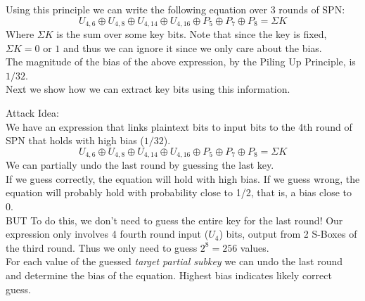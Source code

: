 \documentclass[9pt]{beamer}
\begin{document}
\begin{frame}
Using this principle we can write the following equation over 3 rounds of SPN:
\[ U_{4,6} \oplus U_{4,8} \oplus U_{4,14} \oplus U_{4, 16} \oplus P_5 \oplus P_7 \oplus P_8 = \Sigma K \]
\pause Where $\Sigma K$ is the sum over some key bits. Note that since the key is fixed, $\Sigma K = 0$ or $1$ and thus we can ignore it since we only care about the bias.\\
\vspace{5mm}
\pause The magnitude of the bias of the above expression, by the Piling Up Principle, is $1/32$. \\
\vspace{5mm}
\pause Next we show how we can extract key bits using this information.
\end{frame}

\begin{frame}
Attack Idea:\\
\vspace{3mm}
We have an expression that links plaintext bits to input bits to the 4th round of SPN that holds with high bias ($1/32$). 
\[ U_{4,6} \oplus U_{4,8} \oplus U_{4,14} \oplus U_{4, 16} \oplus P_5 \oplus P_7 \oplus P_8 = \Sigma K \]
\pause We can partially undo the last round by guessing the last key. \\
\vspace{3mm}
\pause
If we guess correctly, the equation will hold with high bias. If we guess wrong, the equation will probably hold with probability close to 1/2, that is, a bias close to 0.\\
\vspace{3mm}
\pause
BUT To do this, we don't need to guess the entire key for the last round! \pause Our expression only involves 4 fourth round input ($U_4$) bits, output from 2 S-Boxes of the third round. Thus we only need to guess $2^8 = 256$ values.\\
\vspace{3mm}
\pause
For each value of the guessed \textit{target partial subkey} we can undo the last round and determine the bias of the equation. Highest bias indicates likely correct guess.
\end{frame}
\end{document}
